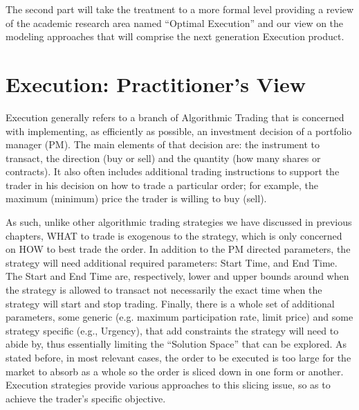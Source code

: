 The second part will take the treatment to a more formal level providing a review of the academic research area named ``Optimal Execution'' and our view on the modeling approaches that will comprise the next generation Execution product.



\section{Execution: Practitioner's View}

Execution generally refers to a branch of Algorithmic Trading that is concerned with  implementing, as efficiently as possible, an investment decision of a portfolio manager (PM). The main elements of that decision are: the instrument to transact, the direction (buy or sell) and the quantity (how many shares or contracts). It also often includes additional trading instructions to support the trader in his decision on how to trade a particular order; for example, the maximum (minimum) price the trader is willing to buy (sell). 


As such, unlike other algorithmic trading strategies we have discussed in previous chapters, WHAT to trade is exogenous to the strategy, which is only concerned on HOW to best trade the order. In addition to the PM directed parameters, the strategy will need additional required parameters: Start Time, and End Time. The Start and End Time are, respectively, lower and upper bounds around when the strategy is allowed to transact not necessarily the exact time when the strategy will start and stop trading. Finally, there is a whole set of additional parameters, some generic (e.g. maximum participation rate, limit price) and some strategy specific (e.g., Urgency), that add constraints the strategy will need to abide by, thus essentially limiting the ``Solution Space'' that can be explored. As stated before, in most relevant cases, the order to be executed is too large for the market to absorb as a whole so the order is sliced down in one form or another. Execution strategies provide various approaches to this slicing issue, so as to achieve the trader's specific objective.


